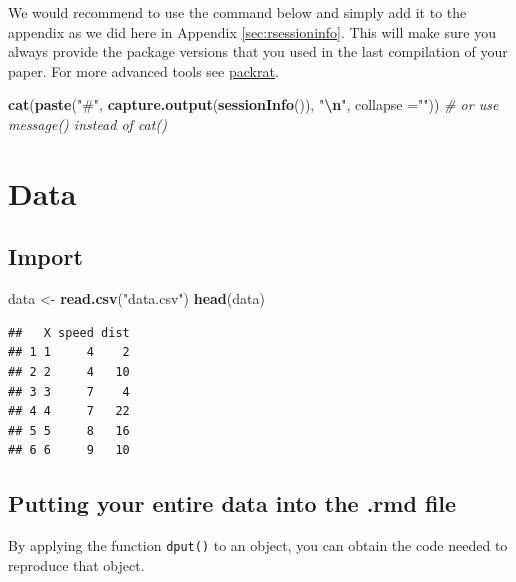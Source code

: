 \documentclass[
  12pt,
]{article}
\newenvironment{Shaded}{\begin{snugshade}}{\end{snugshade}}
\newcommand{\AttributeTok}[1]{\textcolor[rgb]{0.13,0.29,0.53}{#1}}
\newcommand{\CommentTok}[1]{\textcolor[rgb]{0.56,0.35,0.01}{\textit{#1}}}
\newcommand{\FunctionTok}[1]{\textcolor[rgb]{0.13,0.29,0.53}{\textbf{#1}}}
\newcommand{\NormalTok}[1]{#1}
\newcommand{\OtherTok}[1]{\textcolor[rgb]{0.56,0.35,0.01}{#1}}
\newcommand{\SpecialCharTok}[1]{\textcolor[rgb]{0.81,0.36,0.00}{\textbf{#1}}}
\newcommand{\StringTok}[1]{\textcolor[rgb]{0.31,0.60,0.02}{#1}}
\begin{document}
We would recommend to use the command below and simply add it to the appendix as we did here in Appendix \ref{sec:rsessioninfo}. This will make sure you always provide the package versions that you used in the last compilation of your paper. For more advanced tools see \href{https://rstudio.github.io/packrat/}{packrat}.

\begin{Shaded}
\begin{Highlighting}[]
\FunctionTok{cat}\NormalTok{(}\FunctionTok{paste}\NormalTok{(}\StringTok{"\#"}\NormalTok{, }\FunctionTok{capture.output}\NormalTok{(}\FunctionTok{sessionInfo}\NormalTok{()), }\StringTok{"}\SpecialCharTok{\textbackslash{}n}\StringTok{"}\NormalTok{, }\AttributeTok{collapse =}\StringTok{""}\NormalTok{)) }
  \CommentTok{\# or use message() instead of cat()}
\end{Highlighting}
\end{Shaded}

\hypertarget{data}{%
\section{Data}\label{data}}

\hypertarget{import}{%
\subsection{Import}\label{import}}

\begin{Shaded}
\begin{Highlighting}[]
\NormalTok{data }\OtherTok{\textless{}{-}} \FunctionTok{read.csv}\NormalTok{(}\StringTok{"data.csv"}\NormalTok{)}
\FunctionTok{head}\NormalTok{(data)}
\end{Highlighting}
\end{Shaded}

\begin{verbatim}
##   X speed dist
## 1 1     4    2
## 2 2     4   10
## 3 3     7    4
## 4 4     7   22
## 5 5     8   16
## 6 6     9   10
\end{verbatim}

\hypertarget{putting-your-entire-data-into-the-.rmd-file}{%
\subsection{Putting your entire data into the .rmd file}\label{putting-your-entire-data-into-the-.rmd-file}}

By applying the function \texttt{dput()} to an object, you can obtain the code needed to reproduce that object.
\end{document}
